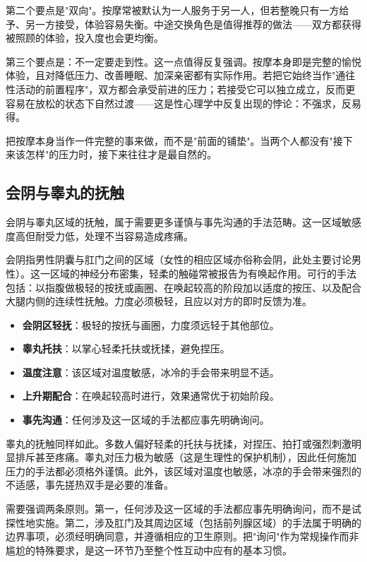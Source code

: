 \documentclass[12pt,UTF8]{ctexbook}
\newcommand{\keyword}[1]{\textbf{#1}}
\begin{document}
第二个要点是"双向"。按摩常被默认为一人服务于另一人，但若整晚只有一方给予、另一方接受，体验容易失衡。中途交换角色是值得推荐的做法——双方都获得被照顾的体验，投入度也会更均衡。

第三个要点是：不一定要走到性。这一点值得反复强调。按摩本身即是完整的愉悦体验，且对降低压力、改善睡眠、加深亲密都有实际作用。若把它始终当作"通往性活动的前置程序"，双方都会承受前进的压力；若接受它可以独立成立，反而更容易在放松的状态下自然过渡——这是性心理学中反复出现的悖论：不强求，反易得。

\begin{tcolorbox}[colback=pink!5!white,colframe=red!50!black,title=贴心小叮咛]
把按摩本身当作一件完整的事来做，而不是"前面的铺垫"。当两个人都没有"接下来该怎样"的压力时，接下来往往才是最自然的。
\end{tcolorbox}
\subsection{会阴与睾丸的抚触}

会阴与睾丸区域的抚触，属于需要更多谨慎与事先沟通的手法范畴。这一区域敏感度高但耐受力低，处理不当容易造成疼痛。

会阴指男性阴囊与肛门之间的区域（女性的相应区域亦俗称会阴，此处主要讨论男性）。这一区域的神经分布密集，轻柔的触碰常被报告为有唤起作用。可行的手法包括：以指腹做极轻的按抚或画圈、在唤起较高的阶段加以适度的按压、以及配合大腿内侧的连续性抚触。力度必须极轻，且应以对方的即时反馈为准。

\begin{itemize}
  \item \keyword{会阴区轻抚}：极轻的按抚与画圈，力度须远轻于其他部位。
  \item \keyword{睾丸托扶}：以掌心轻柔托扶或抚揉，避免捏压。
  \item \keyword{温度注意}：该区域对温度敏感，冰冷的手会带来明显不适。
  \item \keyword{上升期配合}：在唤起较高时进行，效果通常优于初始阶段。
  \item \keyword{事先沟通}：任何涉及这一区域的手法都应事先明确询问。
\end{itemize}

睾丸的抚触同样如此。多数人偏好轻柔的托扶与抚揉，对捏压、拍打或强烈刺激明显排斥甚至疼痛。睾丸对压力极为敏感（这是生理性的保护机制），因此任何施加压力的手法都必须格外谨慎。此外，该区域对温度也敏感，冰凉的手会带来强烈的不适感，事先搓热双手是必要的准备。

需要强调两条原则。第一，任何涉及这一区域的手法都应事先明确询问，而不是试探性地实施。第二，涉及肛门及其周边区域（包括前列腺区域）的手法属于明确的边界事项，必须经明确同意，并遵循相应的卫生原则。把"询问"作为常规操作而非尴尬的特殊要求，是这一环节乃至整个性互动中应有的基本习惯。
\end{document}
